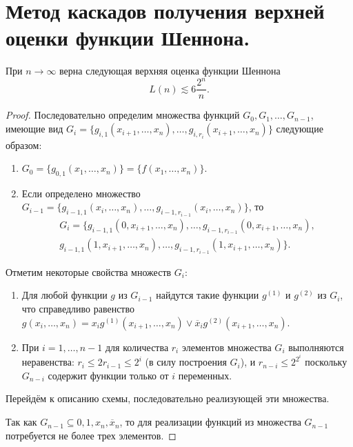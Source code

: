 \section{Метод каскадов получения верхней оценки функции Шеннона.}

\begin{theorem}
    При $n \to \infty$ верна следующая верхняя оценка функции Шеннона
    \[
        L(n) \lesssim 6 \frac{2^n}{n}.
    \]
\end{theorem}

\begin{proof}
    Последовательно определим множества функций $G_0, G_1, \ldots, G_{n-1}$, имеющие вид $G_i = \{g_{i,1}(x_{i+1}, \ldots, x_n), \ldots, g_{i,r_i}(x_{i+1}, \ldots, x_n)\}$ следующие образом:
    \begin{enumerate}[nolistsep]
        \item $G_0 = \{g_{0,1} (x_1, \ldots, x_n)\} = \{f(x_1, \ldots, x_n)\}$.
        \item Если определено множество $G_{i-1} = \{g_{i-1,1}(x_{i}, \ldots, x_n), \ldots, g_{i-1,r_{i-1}}(x_{i}, \ldots, x_n)\}$, то 
        \begin{multline*}
            G_i = \{g_{i-1,1}(0, x_{i+1}, \ldots, x_n), \ldots, g_{i-1,r_{i-1}}(0, x_{i+1}, \ldots, x_n),\\
            g_{i-1,1}(1, x_{i+1}, \ldots, x_n), \ldots, g_{i-1,r_{i-1}}(1, x_{i+1}, \ldots, x_n)\}.
        \end{multline*}
    \end{enumerate}
    Отметим некоторые свойства множеств $G_i$:
    \begin{enumerate}
        \item Для любой функции $g$ из $G_{i-1}$ найдутся такие функции $g^{(1)}$ и $g^{(2)}$ из $G_{i}$, что справедливо равенство $g(x_i, \ldots, x_n) = x_ig^{(1)}(x_{i+1}, \ldots, x_n) \vee \overline{x}_i g^{(2)}(x_{i+1}, \ldots, x_n)$.
        \item При $i=1,\ldots, n-1$ для количества $r_i$ элементов множества $G_i$ выполняются неравенства: $r_i \leqslant 2 r_{i-1} \leqslant 2^i$ (в силу построения $G_i$), и $r_{n-i} \leqslant 2^{2^i}$ поскольку $G_{n-i}$ содержит функции только от $i$ переменных. 
    \end{enumerate}
    Перейдём к описанию схемы, последовательно реализующей эти множества.

    Так как $G_{n-1} \subseteq {0, 1, x_n, \overline{x}_n}$, то для реализации функций из множества $G_{n-1}$ потребуется не более трех элементов.


\end{proof}
